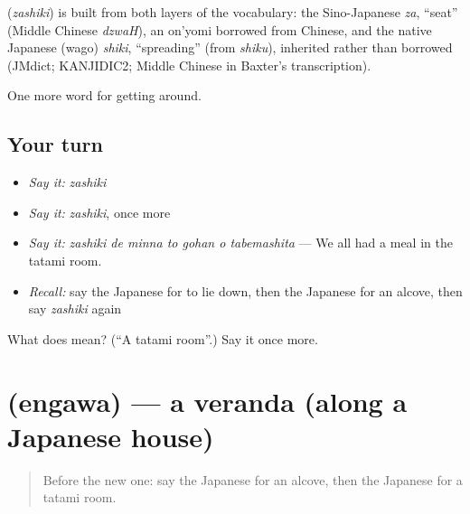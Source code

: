 \begin{cousinweb}
\textbf{} (\emph{zashiki}) is built from both layers of the vocabulary: the Sino-Japanese \emph{za}, \textquotedblleft{}seat\textquotedblright{} (Middle Chinese \emph{dzwaH}), an on'yomi borrowed from Chinese, and the native Japanese (wago) \emph{shiki}, \textquotedblleft{}spreading\textquotedblright{} (from \emph{shiku}), inherited rather than borrowed (JMdict; KANJIDIC2; Middle Chinese in Baxter's transcription).
\end{cousinweb}

\begin{grammarlens}[title={What you've built}]
One more word for getting around.
\end{grammarlens}

\subsection*{Your turn}
\begin{itemize}
\raggedright
  \item \emph{Say it:} \emph{zashiki}
  \item \emph{Say it:} \emph{zashiki}, once more
  \item \emph{Say it:} \emph{zashiki de minna to gohan o tabemashita} — We all had a meal in the tatami room.
  \item \emph{Recall:} say the Japanese for to lie down, then the Japanese for an alcove, then say \emph{zashiki} again
\end{itemize}

\begin{tcolorbox}[breakable,colback=teal!4,colframe=teal!35!black,title={Before you move on}]
What does  mean? (\textquotedblleft{}A tatami room\textquotedblright{}.) Say it once more.
\end{tcolorbox}
\section[\texorpdfstring{\ja{えんがわ} (engawa)}{えんがわ (engawa)}]{ (engawa) — a veranda (along a Japanese house)}

\label{lesson:JA-C400-engawa}



\begin{quote}
Before the new one: say the Japanese for an alcove, then the Japanese for a tatami room.
\end{quote}

